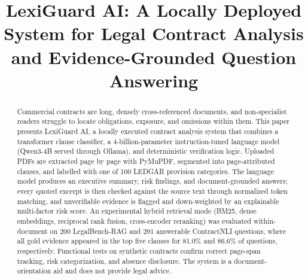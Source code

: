 \documentclass[conference]{IEEEtran}
\begin{document}
\title{LexiGuard AI: A Locally Deployed System for Legal Contract Analysis and Evidence-Grounded Question Answering}

\author{
\and
{}
\and
{}
}

\maketitle

\begin{abstract}
Commercial contracts are long, densely cross-referenced documents, and non-specialist readers struggle to locate obligations, exposure, and omissions within them. This paper presents LexiGuard AI, a locally executed contract analysis system that combines a transformer clause classifier, a 4-billion-parameter instruction-tuned language model (Qwen3-4B served through Ollama), and deterministic verification logic. Uploaded PDFs are extracted page by page with PyMuPDF, segmented into page-attributed clauses, and labelled with one of 100 LEDGAR provision categories. The language model produces an executive summary, risk findings, and document-grounded answers; every quoted excerpt is then checked against the source text through normalized token matching, and unverifiable evidence is flagged and down-weighted by an explainable multi-factor risk score. An experimental hybrid retrieval mode (BM25, dense embeddings, reciprocal rank fusion, cross-encoder reranking) was evaluated within-document on 200 LegalBench-RAG and 291 answerable ContractNLI questions, where all gold evidence appeared in the top five clauses for 81.0\% and 86.6\% of questions, respectively. Functional tests on synthetic contracts confirm correct page-span tracking, risk categorization, and absence disclosure. The system is a document-orientation aid and does not provide legal advice.
\end{abstract}
\end{document}
